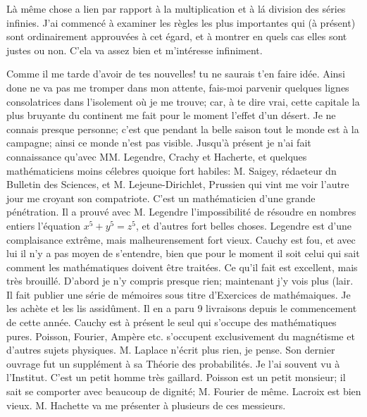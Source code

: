 \documentclass{article}
\begin{document}
Là même chose a lien par rapport à la multiplication et à lá division des séries infinies. J'ai commencé à examiner les règles les plus importantes qui (à présent) sont ordinairement approuvées à cet égard, et à montrer en quels cas elles sont justes ou non. C'ela va assez bien et m'intéresse infiniment.

Comme il me tarde d'avoir de tes nouvelles! tu ne saurais t'en faire idée. Ainsi done ne va pas me tromper dans mon attente, fais-moi parvenir quelques lignes consolatrices dans l'isolement où je me trouve; car, à te dire vrai, cette capitale la plus bruyante du continent me fait pour le moment l'effet d'un désert. Je ne connais presque personne; c'est que pendant la belle saison tout le monde est à la campagne; ainsi ce monde n'est pas visible. Jusqu'à présent je n'ai fait connaissance qu'avec MM. Legendre, Crachy et Hacherte, et quelques mathématiciens moins célebres quoique fort habiles: M. Saigey, rédaeteur dn Bulletin des Sciences, et M. Lejeune-Dirichlet, Prussien qui vint me voir l'autre jour me croyant son compatriote. C'est un mathématicien d'une grande pénétration. Il a prouvé avec M. Legendre l'impossibilité de résoudre en nombres entiers l'équation \(x^{5}+y^{5}=z^{5}\), et d'autres fort belles choses. Legendre est d'une complaisance extrême, mais malheurensement fort vieux. Cauchy est fou, et avec lui il n'y a pas moyen de s'entendre, bien que pour le moment il soit celui qui sait comment les mathématiques doivent être traitées. Ce qu'il fait est excellent, mais très brouillé. D'abord je n'y compris presque rien; maintenant j'y vois plus (lair. Il fait publier une série de mémoires sous titre d'Exercices de mathémaiques. Je les achète et les lis assidûment. Il en a paru 9 livraisons depuis le commencement de cette année. Cauchy est à présent le seul qui s'occupe des mathématiques pures. Poisson, Fourier, Ampère etc. s'occupent exclusivement du magnétisme et d'autres sujets physiques. M. Laplace n'écrit plus rien, je pense. Son dernier ouvrage fut un supplément à sa Théorie des probabilités. Je l'ai souvent vu à l'Institut. C'est un petit homme très gaillard. Poisson est un petit monsieur; il sait se comporter avec beaucoup de dignité; M. Fourier de même. Lacroix est bien vieux. M. Hachette va me présenter à plusieurs de ces messieurs.
\end{document}
